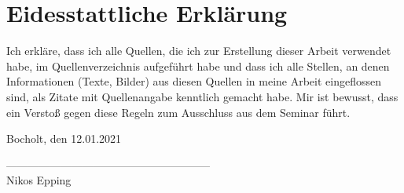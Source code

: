\section{Eidesstattliche Erklärung}
Ich erkläre, dass ich alle Quellen, die ich zur Erstellung dieser Arbeit verwendet habe, im Quellenverzeichnis aufgeführt habe und dass ich alle Stellen, an denen Informationen (Texte, Bilder) aus diesen Quellen in meine Arbeit eingeflossen sind, als Zitate mit Quellenangabe kenntlich gemacht habe.
Mir ist bewusst, dass ein Verstoß gegen diese Regeln zum Ausschluss aus dem Seminar führt.

\vspace{1.5cm}

\small
Bocholt, den 12.01.2021

\vspace{0.8cm}

--------------------------------------------------------\\
Nikos Epping